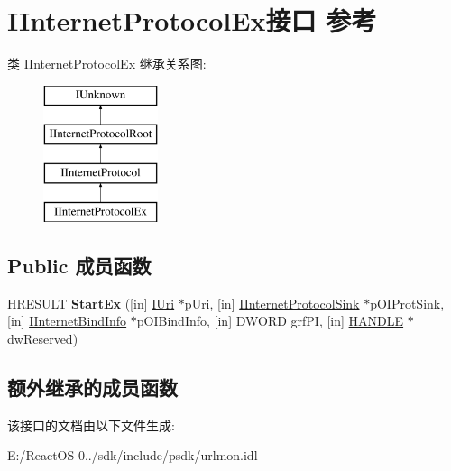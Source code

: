 \hypertarget{interface_i_internet_protocol_ex}{}\section{I\+Internet\+Protocol\+Ex接口 参考}
\label{interface_i_internet_protocol_ex}
类 I\+Internet\+Protocol\+Ex 继承关系图\+:\begin{figure}[H]
\begin{center}
\leavevmode
\includegraphics[height=4.000000cm]{interface_i_internet_protocol_ex}
\end{center}
\end{figure}
\subsection*{Public 成员函数}
\begin{DoxyCompactItemize}
\item 
\mbox{\label{interface_i_internet_protocol_ex_a3aee60178e03e44b04389713a565b051}} 
H\+R\+E\+S\+U\+LT {\bfseries Start\+Ex} (\mbox{[}in\mbox{]} \hyperlink{interface_i_uri}{I\+Uri} $\ast$p\+Uri, \mbox{[}in\mbox{]} \hyperlink{interface_i_internet_protocol_sink}{I\+Internet\+Protocol\+Sink} $\ast$p\+O\+I\+Prot\+Sink, \mbox{[}in\mbox{]} \hyperlink{interface_i_internet_bind_info}{I\+Internet\+Bind\+Info} $\ast$p\+O\+I\+Bind\+Info, \mbox{[}in\mbox{]} D\+W\+O\+RD grf\+PI, \mbox{[}in\mbox{]} \hyperlink{interfacevoid}{H\+A\+N\+D\+LE} $\ast$dw\+Reserved)
\end{DoxyCompactItemize}
\subsection*{额外继承的成员函数}


该接口的文档由以下文件生成\+:\begin{DoxyCompactItemize}
\item 
E\+:/\+React\+O\+S-\/0../sdk/include/psdk/urlmon.\+idl\end{DoxyCompactItemize}

